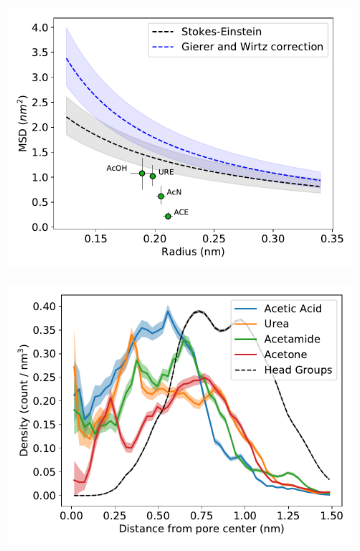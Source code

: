 \documentclass{article}
\begin{document}
  \begin{figure}[!htb]
  \centering
  \begin{subfigure}{0.325\textwidth}
  \includegraphics[width=\textwidth]{msd_radius_ketones_10wt.pdf}
  \caption{}\label{fig:ketones_rdf}
  \end{subfigure}
  \begin{subfigure}{0.325\textwidth}
  \includegraphics[width=\textwidth]{ketone_rdf.pdf}
  \caption{}\label{fig:ketones_rdf}
  \end{subfigure}
  \begin{subfigure}{0.325\textwidth}

\end{subfigure}
\end{figure}
\end{document}
